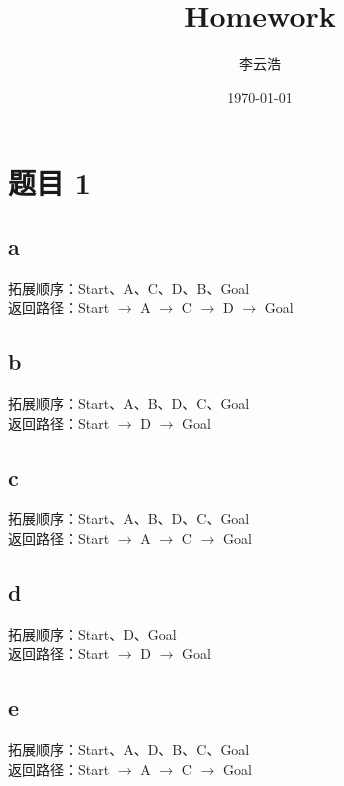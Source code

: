 \documentclass{article}
\title{Homework}
\author{李云浩}
\date{\today}
\begin{document}
\maketitle
\section{题目 1}
\subsection{a}
拓展顺序：Start、A、C、D、B、Goal\\
返回路径：Start $\rightarrow$ A $\rightarrow$ C $\rightarrow$ D $\rightarrow$ Goal
\subsection{b}
拓展顺序：Start、A、B、D、C、Goal\\
返回路径：Start $\rightarrow$ D $\rightarrow$ Goal
\subsection{c} 
拓展顺序：Start、A、B、D、C、Goal\\
返回路径：Start $\rightarrow$ A $\rightarrow$ C $\rightarrow$ Goal
\subsection{d}
拓展顺序：Start、D、Goal\\
返回路径：Start $\rightarrow$ D $\rightarrow$ Goal
\subsection{e}
拓展顺序：Start、A、D、B、C、Goal\\
返回路径：Start $\rightarrow$ A $\rightarrow$ C $\rightarrow$ Goal 
\end{document}
